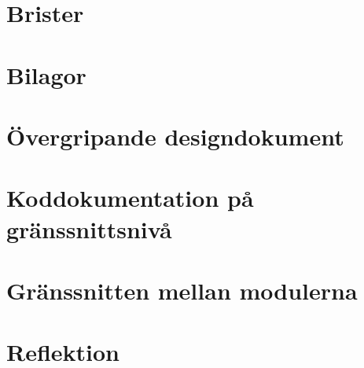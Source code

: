\documentclass{article}
\begin{document}
\section{Brister}


\section{Bilagor}
\appendix
\section{Övergripande designdokument}
\label{sec:design}
\section{Koddokumentation på gränssnittsnivå}
\section{Gränssnitten mellan modulerna}
\section{Reflektion}
\end{document}

